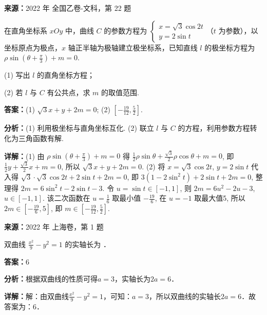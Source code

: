 \begin{question}[points=10]
\textbf{来源：}2022 年 全国乙卷-文科，第 22 题\par
[选修4-4：坐标系与参数方程]

在直角坐标系 $xOy$ 中，曲线 $C$ 的参数方程为 $\begin{cases} x = \sqrt{3}\cos 2t \\ y = 2\sin t \end{cases}$（$t$ 为参数），以坐标原点为极点，$x$ 轴正半轴为极轴建立极坐标系，已知直线 $l$ 的极坐标方程为 $\rho\sin(\theta+\frac{\pi}{3})+m=0$.

(1) 写出 $l$ 的直角坐标方程；

(2) 若 $l$ 与 $C$ 有公共点，求 $m$ 的取值范围.
\begin{solution}
\textbf{答案：}(1) $\sqrt{3}x+y+2m=0$; (2) $[-\frac{19}{12}, \frac{5}{2}]$.

\textbf{分析：}(1) 利用极坐标与直角坐标互化.
(2) 联立 $l$ 与 $C$ 的方程，利用参数方程转化为三角函数有解.

\textbf{详解：}(1) 由 $\rho\sin(\theta+\frac{\pi}{3})+m=0$ 得 $\frac12\rho\sin\theta+\frac{\sqrt3}{2}\rho\cos\theta+m=0$, 即 $\frac12 y+\frac{\sqrt3}{2}x+m=0$, 所以 $\sqrt3 x+y+2m=0$.
(2) 将 $x=\sqrt3\cos2t$, $y=2\sin t$ 代入得 $\sqrt3\cdot\sqrt3\cos2t + 2\sin t + 2m=0$, 即 $3(1-2\sin^2t)+2\sin t+2m=0$, 整理得 $2m=6\sin^2t -2\sin t -3$. 令 $u=\sin t\in[-1,1]$, 则 $2m=6u^2-2u-3$, $u\in[-1,1]$. 该二次函数在 $u=\frac16$ 取最小值 $-\frac{19}{6}$, 在 $u=-1$ 取最大值5, 所以 $2m\in[-\frac{19}{6},5]$, 即 $m\in[-\frac{19}{12},\frac52]$.
\end{solution}
\end{question}

\begin{question}[points=4]
\textbf{来源：}2022 年 上海卷，第 1 题\par
双曲线 $\frac{x^2}{9} - y^2 = 1$ 的实轴长为 ．
\fillin[{$6$}]
\begin{solution}
\textbf{答案：}$6$

\textbf{分析：}根据双曲线的性质可得$a=3$，实轴长为$2a=6$．

\textbf{详解：}解：由双曲线$\frac{x^2}{9} - y^2 = 1$，可知：$a=3$，所以双曲线的实轴长$2a=6$．故答案为：$6$．
\end{solution}
\end{question}

